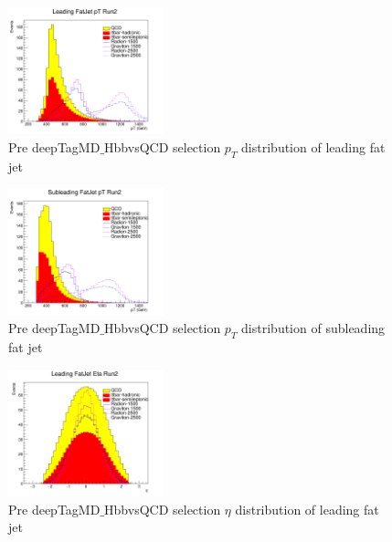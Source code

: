 \begin{figure}[!htb]
	\centering
	\includegraphics[width=0.4\textwidth]{Figures/pt0TT_Run2_deepTagMD_HbbvsQCD.png}
	\caption{Pre deepTagMD$\_$HbbvsQCD selection $p_T$ distribution of leading fat jet}
	\label{fig:prePtlead}
\end{figure}
\begin{figure}[!htb]
	\centering
	\includegraphics[width=0.4\textwidth]{Figures/pt1TT_Run2_deepTagMD_HbbvsQCD.png}
	\caption{Pre deepTagMD$\_$HbbvsQCD selection $p_T$ distribution of subleading fat jet}
	\label{fig:prePtsub}
\end{figure}
\begin{figure}[!htb]
	\centering
	\includegraphics[width=0.4\textwidth]{Figures/eta0TT_Run2_deepTagMD_HbbvsQCD.png}
	\caption{Pre deepTagMD$\_$HbbvsQCD selection $\eta$ distribution of leading fat jet}
	\label{fig:preEtalead}
\end{figure}
